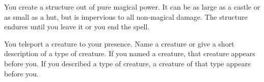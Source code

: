 


 You create a structure out of pure magical power. It can be as large as a castle or as small as a hut, but is impervious to all non-magical damage. The structure endures until you leave it or you end the spell.





 You teleport a creature to your presence. Name a creature or give a short description of a type of creature. If you named a creature, that creature appears before you. If you described a type of creature, a creature of that type appears before you.



